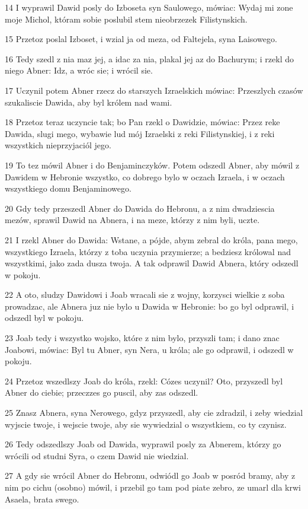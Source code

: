 \par 14 I wyprawil Dawid posly do Izboseta syn Saulowego, mówiac: Wydaj mi zone moje Michol, któram sobie poslubil stem nieobrzezek Filistynskich.
\par 15 Przetoz poslal Izboset, i wzial ja od meza, od Faltejela, syna Laisowego.
\par 16 Tedy szedl z nia maz jej, a idac za nia, plakal jej az do Bachurym; i rzekl do niego Abner: Idz, a wróc sie; i wrócil sie.
\par 17 Uczynil potem Abner rzecz do starszych Izraelskich mówiac: Przeszlych czasów szukaliscie Dawida, aby byl królem nad wami.
\par 18 Przetoz teraz uczyncie tak; bo Pan rzekl o Dawidzie, mówiac: Przez reke Dawida, slugi mego, wybawie lud mój Izraelski z reki Filistynskiej, i z reki wszystkich nieprzyjaciól jego.
\par 19 To tez mówil Abner i do Benjaminczyków. Potem odszedl Abner, aby mówil z Dawidem w Hebronie wszystko, co dobrego bylo w oczach Izraela, i w oczach wszystkiego domu Benjaminowego.
\par 20 Gdy tedy przeszedl Abner do Dawida do Hebronu, a z nim dwadziescia mezów, sprawil Dawid na Abnera, i na meze, którzy z nim byli, uczte.
\par 21 I rzekl Abner do Dawida: Wstane, a pójde, abym zebral do króla, pana mego, wszystkiego Izraela, którzy z toba uczynia przymierze; a bedziesz królowal nad wszystkimi, jako zada dusza twoja. A tak odprawil Dawid Abnera, który odszedl w pokoju.
\par 22 A oto, sludzy Dawidowi i Joab wracali sie z wojny, korzysci wielkie z soba prowadzac, ale Abnera juz nie bylo u Dawida w Hebronie: bo go byl odprawil, i odszedl byl w pokoju.
\par 23 Joab tedy i wszystko wojsko, które z nim bylo, przyszli tam; i dano znac Joabowi, mówiac: Byl tu Abner, syn Nera, u króla; ale go odprawil, i odszedl w pokoju.
\par 24 Przetoz wszedlszy Joab do króla, rzekl: Cózes uczynil? Oto, przyszedl byl Abner do ciebie; przeczzes go puscil, aby zas odszedl.
\par 25 Znasz Abnera, syna Nerowego, gdyz przyszedl, aby cie zdradzil, i zeby wiedzial wyjscie twoje, i wejscie twoje, aby sie wywiedzial o wszystkiem, co ty czynisz.
\par 26 Tedy odszedlszy Joab od Dawida, wyprawil posly za Abnerem, którzy go wrócili od studni Syra, o czem Dawid nie wiedzial.
\par 27 A gdy sie wrócil Abner do Hebronu, odwiódl go Joab w posród bramy, aby z nim po cichu (osobno) mówil, i przebil go tam pod piate zebro, ze umarl dla krwi Asaela, brata swego.
